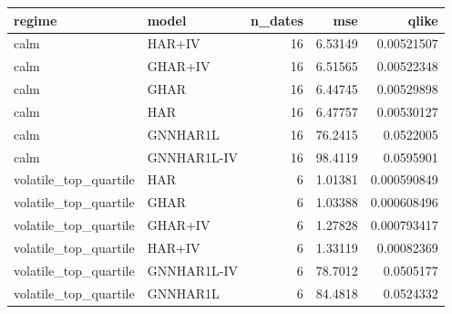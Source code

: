 \begin{tabular}{llrrr}
\toprule
regime & model & n_dates & mse & qlike \\
\midrule
calm & HAR+IV & 16 & 6.53149 & 0.00521507 \\
calm & GHAR+IV & 16 & 6.51565 & 0.00522348 \\
calm & GHAR & 16 & 6.44745 & 0.00529898 \\
calm & HAR & 16 & 6.47757 & 0.00530127 \\
calm & GNNHAR1L & 16 & 76.2415 & 0.0522005 \\
calm & GNNHAR1L-IV & 16 & 98.4119 & 0.0595901 \\
volatile_top_quartile & HAR & 6 & 1.01381 & 0.000590849 \\
volatile_top_quartile & GHAR & 6 & 1.03388 & 0.000608496 \\
volatile_top_quartile & GHAR+IV & 6 & 1.27828 & 0.000793417 \\
volatile_top_quartile & HAR+IV & 6 & 1.33119 & 0.00082369 \\
volatile_top_quartile & GNNHAR1L-IV & 6 & 78.7012 & 0.0505177 \\
volatile_top_quartile & GNNHAR1L & 6 & 84.4818 & 0.0524332 \\
\bottomrule
\end{tabular}
